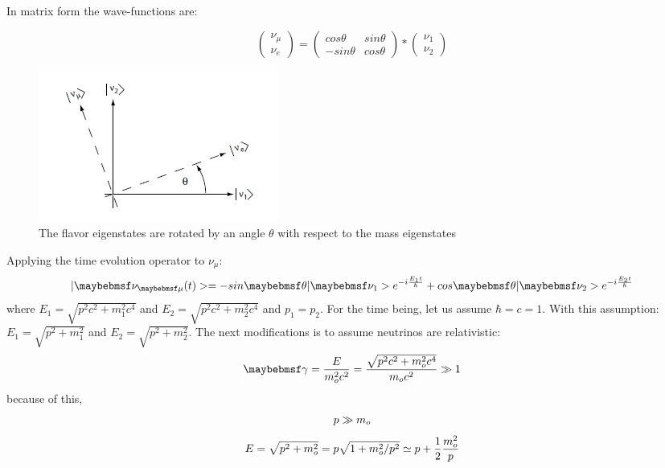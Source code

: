In matrix form the wave-functions are:

\begin{equation}
\begin{pmatrix}
\nu_{\mu} \\
\nu_{e}
\end{pmatrix} 
 = \begin{pmatrix}
cos\theta & sin\theta \\
-sin\theta & cos\theta 
\end{pmatrix}*
\begin{pmatrix}
\nu_{1} \\
\nu_{2} 
\end{pmatrix}
\end{equation}


\begin{figure}[htp]
\centering
\includegraphics[scale=.8]{figs/mixingangle.jpg}
\caption{The flavor eigenstates are rotated by an angle $\theta$ with respect to the mass eigenstates}
\label{fig:mixing}
\end{figure}
Applying the time evolution operator to $\nu_{\mu}$:
\begin{equation}
\centering
\label{eq:timeevol}
|\nu_{\mu}(t)> = -sin\theta|\nu_{1}>e^{-i\frac{E_{1}t}{\hbar}} + cos\theta|\nu_{2}>e^{-i\frac{E_{2}t}{\hbar}}
\end{equation}
where $E_{1} = \sqrt{p^2 c^2 + m^2_{1} c^4}$ and $E_{2} = \sqrt{p^2 c^2 + m^2_{2} c^4}$ and $p_{1}=p_{2}$. For the time being, let us assume $\hbar=c=1$. 
With this assumption:
$E_{1}=\sqrt{p^2+m^2_{1}}$ and $E_{2} = \sqrt{p^2 + m^2_{2}}$.
The next modifications is to assume neutrinos are relativistic:
\begin{equation}
\centering
\label{eq:gamma}
\gamma = \frac{E}{m^2_{o} c^2} = \frac{\sqrt{p^2 c^2 + m^2_{o} c^4}}{m_{o} c^2} \gg 1
\end{equation}
because of this,
\begin{equation}
\centering
p \gg m_{o}
\end{equation}
\begin{equation}
\centering
E = \sqrt{p^2 + m^2_{o}}=p\sqrt{1+m^2_{o}/p^2}\simeq p + \frac{1}{2}\frac{m^2_{o}}{p}
\end{equation}
